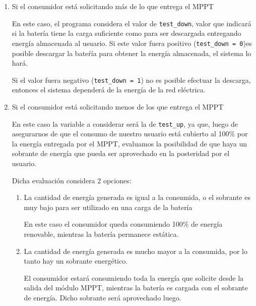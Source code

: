                     \begin{enumerate}
                    \setlength{\itemindent}{1.5em}
                    
                        \item Si el consumidor está solicitando más de lo que entrega el MPPT\par
                        
                        En este caso, el programa considera el valor de \texttt{test\_down}, valor que indicará si la batería tiene la carga suficiente como para ser descargada entregando energía almacenada al usuario.
                        Si este valor fuera positivo (\texttt{test\_down = 0})es posible descargar la bateŕía para obtener la energía almacenada, el sistema lo hará.\par
                        Si el valor fuera negativo (\texttt{test\_down = 1}) no es posible efectuar la descarga, entonces el sistema dependerá de la energía de la red eléctrica.\par
                        \item Si el consumidor está solicitando menos de los que entrega el MPPT\par
                        
                        En este caso la variable a considerar será la de \texttt{test\_up}, ya que, luego de asegurarnos de que el consumo de nuestro usuario está cubierto al 100\% por la energía entregada por el MPPT, evaluamos la posibilidad de que haya un sobrante de energía que pueda ser aprovechado en la posteridad por el usuario.\par
                        Dicha evaluación considera 2 opciones:\par
                        \begin{enumerate}
                        \setlength{\itemindent}{1.5em}
                        
                            \item La cantidad de energía generada es igual a la consumida, o el sobrante es muy bajo para ser utilizado en una carga de la batería\par
                            
                            En este caso el consumidor queda consumiendo 100\% de energía renovable, mientras la batería permanece estática.\par
                            \item La cantidad de energía generada es mucho mayor a la consumida, por lo tanto hay un sobrante energético.\par
                            
                            El consumidor estará consumiendo toda la energía que solicite desde la salida del módulo MPPT, mientras la batería es cargada con el sobrante de energía. Dicho sobrante será aprovechado luego.\par


\end{enumerate}
\end{enumerate}
